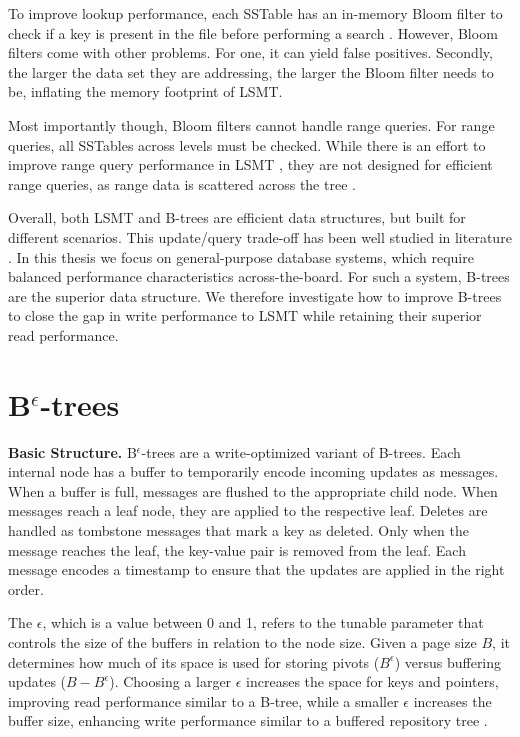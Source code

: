 To improve lookup performance, each SSTable has an in-memory Bloom filter to check if a key is present in the file before performing a search \cite{chang2008bigtable}.
However, Bloom filters come with other problems. 
For one, it can yield false positives.
Secondly, the larger the data set they are addressing, the larger the Bloom filter needs to be, inflating the memory footprint of \ac{LSMT}.

Most importantly though, Bloom filters cannot handle range queries.
For range queries, all SSTables across levels must be checked. 
While there is an effort to improve range query performance in \ac{LSMT} \cite{zhong2021remix}, they are not designed for efficient range queries, as range data is scattered across the tree \cite{sarkar2022lsmt}.

Overall, both \ac{LSMT} and B-trees are efficient data structures, but built for different scenarios.
This update/query trade-off has been well studied in literature \cite{brodal2003lower}.
In this thesis we focus on general-purpose database systems, which require balanced performance characteristics across-the-board.
For such a system, B-trees are the superior data structure.
We therefore investigate how to improve B-trees to close the gap in write performance to \ac{LSMT} while retaining their superior read performance.


\section{B$^\epsilon$-trees}
\label{sec:related-work-bepsilontrees}
\textbf{Basic Structure.}
B$^\epsilon$-trees \cite{bender2015epsilon} are a write-optimized variant of B-trees.
Each internal node has a buffer to temporarily encode incoming updates as messages.
When a buffer is full, messages are flushed to the appropriate child node.
When messages reach a leaf node, they are applied to the respective leaf.
Deletes are handled as tombstone messages that mark a key as deleted. Only when the message reaches the leaf, the key-value pair is removed from the leaf.
Each message encodes a timestamp to ensure that the updates are applied in the right order.

The $\epsilon$, which is a value between 0 and 1, refers to the tunable parameter that controls the size of the buffers in relation to the node size.
Given a page size $B$, it determines how much of its space is used for storing pivots ($B^\epsilon$) versus buffering updates ($B - B^\epsilon$).
Choosing a larger $\epsilon$ increases the space for keys and pointers, improving read performance similar to a B-tree, while a smaller $\epsilon$ increases the buffer size, enhancing write performance similar to a buffered repository tree \cite{buchsbaum2000external}.

